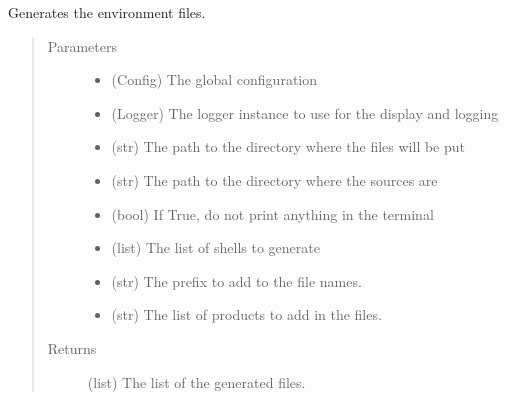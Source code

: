 \documentclass[a4paper,10pt,english]{sphinxmanual}
\begin{document}
\begin{fulllineitems}
\label{\detokenize{apidoc_commands/commands:commands.environ.write_all_source_files}}
Generates the environment files.
\begin{quote}\begin{description}
\item[{Parameters}] \leavevmode\begin{itemize}
\item {} 
 \textendash{} (Config) The global configuration

\item {} 
 \textendash{} (Logger)
The logger instance to use for the display and logging

\item {} 
 \textendash{} (str) 
The path to the directory where the files will be put

\item {} 
 \textendash{} (str) 
The path to the directory where the sources are

\item {} 
 \textendash{} (bool) 
If True, do not print anything in the terminal

\item {} 
 \textendash{} (list) The list of shells to generate

\item {} 
 \textendash{} (str) The prefix to add to the file names.

\item {} 
 \textendash{} (str) The list of products to add in the files.

\end{itemize}

\item[{Returns}] \leavevmode
(list) The list of the generated files.

\end{description}\end{quote}

\end{fulllineitems}
\end{document}
